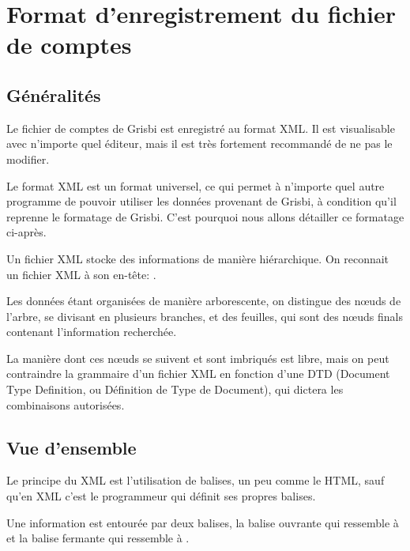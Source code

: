 
\chapter{Format d'enregistrement du fichier de comptes\label{xml}}

\section{Généralités\label{xml-general}}

Le fichier de comptes de Grisbi est enregistré au format XML. Il est 
visualisable avec n'importe quel éditeur, mais il est très fortement recommandé
de ne pas le modifier.

Le format XML est un format universel, ce qui permet à n'importe quel autre 
programme de pouvoir utiliser les données provenant de Grisbi, à condition qu'il 
reprenne le formatage de Grisbi. C'est pourquoi nous allons détailler ce 
formatage ci-après.

Un fichier XML stocke des informations de manière hiérarchique. On reconnait
un fichier XML à son en-tête: .

Les données étant organisées de manière arborescente, on distingue des n{\oe}uds de 
l'arbre, se divisant en plusieurs branches, et des feuilles, qui sont des n{\oe}uds 
finals contenant l'information recherchée.

La manière dont ces n{\oe}uds se suivent et sont imbriqués est libre, mais on
peut contraindre la grammaire d'un fichier XML en fonction d'une DTD
(Document Type Definition, ou Définition de Type de Document), qui dictera
les combinaisons autorisées.

\section{Vue d'ensemble}

Le principe du XML est l'utilisation de balises, un peu comme le HTML, sauf
qu'en XML c'est le programmeur qui définit ses propres balises.

Une information est entourée par deux balises, la balise ouvrante qui ressemble
à  et la balise fermante qui ressemble à .

